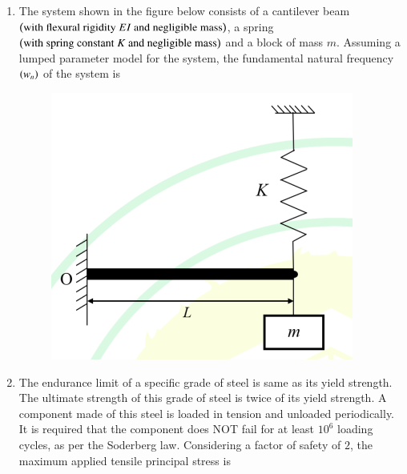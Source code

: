 \documentclass[journal]{IEEEtran}
\begin{document}
\begin{enumerate}[leftmargin=0pt]
\item
The system shown in the figure below consists of a cantilever beam $\left(\text{with flexural rigidity } EI \text{ and negligible mass}\right)$, a spring $\left(\text{with spring constant } K \text{ and negligible mass}\right)$ and a block of mass $m$. Assuming a lumped parameter model for the system, the fundamental natural frequency $\left(w_n\right)$ of the system is
\begin{figure}[H]\includegraphics[width=0.5\columnwidth]{Figs/image - 2025-08-24T165339.288.png}\caption*{}\label{fig:q42}\end{figure}
\begin{enumerate}
\end{enumerate}
\hfill{}

\item
The endurance limit of a specific grade of steel is same as its yield strength. The ultimate strength of this grade of steel is twice of its yield strength. A component made of this steel is loaded in tension and unloaded periodically. It is required that the component does NOT fail for at least $10^6$ loading cycles, as per the Soderberg law. Considering a factor of safety of $2$, the maximum applied tensile principal stress is
\begin{enumerate}
\end{enumerate}
\hfill{}


\end{enumerate}
\end{document}

